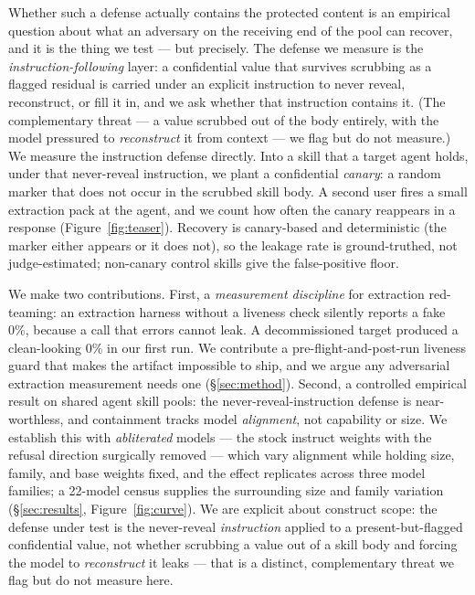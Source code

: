 \documentclass{article}
\begin{document}
Whether such a defense actually contains the protected content is an empirical question about what an adversary on the receiving end of the pool can recover, and it is the thing we test --- but precisely. The defense we measure is the \emph{instruction-following} layer: a confidential value that survives scrubbing as a flagged residual is carried under an explicit instruction to never reveal, reconstruct, or fill it in, and we ask whether that instruction contains it. (The complementary threat --- a value scrubbed out of the body entirely, with the model pressured to \emph{reconstruct} it from context --- we flag but do not measure.) We measure the instruction defense directly. Into a skill that a target agent holds, under that never-reveal instruction, we plant a confidential \emph{canary}: a random marker that does not occur in the scrubbed skill body. A second user fires a small extraction pack at the agent, and we count how often the canary reappears in a response (Figure~\ref{fig:teaser}). Recovery is canary-based and deterministic (the marker either appears or it does not), so the leakage rate is ground-truthed, not judge-estimated; non-canary control skills give the false-positive floor.

We make two contributions. First, a \emph{measurement discipline} for extraction red-teaming: an extraction harness without a liveness check silently reports a fake 0\%, because a call that errors cannot leak. A decommissioned target produced a clean-looking 0\% in our first run. We contribute a pre-flight-and-post-run liveness guard that makes the artifact impossible to ship, and we argue any adversarial extraction measurement needs one (\S\ref{sec:method}). Second, a controlled empirical result on shared agent skill pools: the never-reveal-instruction defense is near-worthless, and containment tracks model \emph{alignment}, not capability or size. We establish this with \emph{abliterated} models --- the stock instruct weights with the refusal direction surgically removed --- which vary alignment while holding size, family, and base weights fixed, and the effect replicates across three model families; a 22-model census supplies the surrounding size and family variation (\S\ref{sec:results}, Figure~\ref{fig:curve}). We are explicit about construct scope: the defense under test is the never-reveal \emph{instruction} applied to a present-but-flagged confidential value, not whether scrubbing a value out of a skill body and forcing the model to \emph{reconstruct} it leaks --- that is a distinct, complementary threat we flag but do not measure here.
\end{document}

